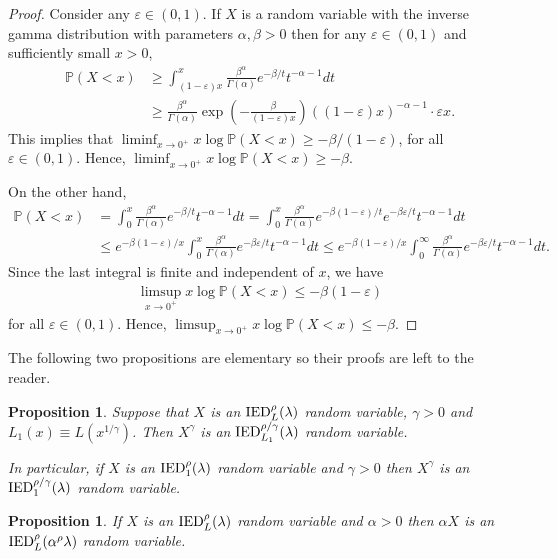 \documentclass[bj]{imsart}
\numberwithin{equation}{section}
\renewcommand{\P}{\mathbb{P}}
\newcommand{\IED}{{\rm IED}}
\newcommand{\1}{\mathbf{1}}
\newtheorem{propo}[thm]{Proposition}
\theoremstyle{definition}
\newcommand{\eps}{\varepsilon}
\begin{document}
\begin{proof}
Consider any $\eps\in(0,1)$.
If $X$ is a random variable with the inverse gamma distribution with parameters $\alpha, \beta>0$ then for any $\eps\in(0,1)$ and sufficiently small $x>0$,
\begin{align*}
 \P(X<x)&\geq  \int_{(1-\varepsilon)x}^x\frac{\beta^\alpha}{\Gamma(\alpha)}e^{-\beta/t}t^{-\alpha-1}dt \\
 &\geq \frac{\beta^\alpha}{\Gamma(\alpha)}\exp\left(-\frac{\beta}{(1-\varepsilon)x}\right)((1-\varepsilon)x)^{-\alpha-1}\cdot\varepsilon x.
\end{align*}
This implies that $\liminf_{x\to 0^+}x\log \P(X<x)\geq -\beta/(1-\varepsilon)$, for all $\varepsilon \in (0,1)$. Hence, $\liminf_{x\to 0^+}x\log \P(X<x)\geq -\beta$.

On the other hand, 
\begin{align*}
\P(X<x)&
= \int_0^x \frac{\beta^\alpha}{\Gamma(\alpha)}e^{-\beta/t}t^{-\alpha-1}dt 
= \int_0^x \frac{\beta^\alpha}{\Gamma(\alpha)}
e^{-\beta (1-\varepsilon)/t}e^{-\beta\eps/t}t^{-\alpha-1}dt \\
&
\leq e^{-\beta (1-\varepsilon)/x} \int_0^x 
\frac{\beta^\alpha}{\Gamma(\alpha)}
e^{-\beta\eps/t}t^{-\alpha-1}dt
\leq e^{-\beta (1-\varepsilon)/x}\int_{0}^\infty\frac{\beta^\alpha}{\Gamma(\alpha)}e^{-\beta \varepsilon/t}t^{-\alpha-1}dt.
\end{align*}
Since the last integral is finite and independent of $x$, we have 
\begin{align*}
\limsup_{x\to 0^+}x\log \P(X<x)\leq -\beta (1-\varepsilon)
\end{align*}
 for all $\varepsilon \in (0,1)$. Hence, $\limsup_{x\to 0^+}x\log \P(X<x)\leq -\beta$. 
\end{proof}

\rm
The following two propositions are elementary so their proofs are left to the reader.

\begin{propo} \label{n3.3}
 Suppose that  $X$ is an $\IED^\rho_L(\lambda)$ random variable, $\gamma>0$ and $L_1(x) \equiv L(x^{1/\gamma})$. Then $X^\gamma$ is an $\IED^{\rho/\gamma}_{L_1}(\lambda)$ random variable.
 
 In particular, if $X$ is an $\IED^\rho_1(\lambda)$ random variable and $\gamma>0$ then $X^\gamma$ is an $\IED^{\rho/\gamma}_1(\lambda)$ random variable.

\end{propo}

\begin{propo} \label{propo:closureOnMultiplication} 
If  $X$ is an $\IED^\rho_L(\lambda)$ random variable and $\alpha>0$ then $\alpha X$ is an $\IED^{\rho}_{L}(\alpha^\rho\lambda)$ random variable.
\end{propo}
\end{document}
